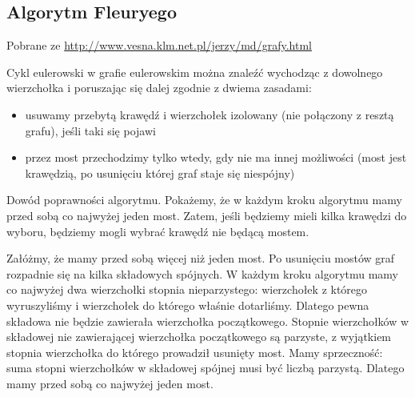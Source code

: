 \subsection{Algorytm Fleuryego}
Pobrane ze \url{http://www.vesna.klm.net.pl/jerzy/md/grafy.html}\\
\begin{definition}
Cykl eulerowski w grafie eulerowskim można znaleźć wychodząc z dowolnego wierzchołka i poruszając się dalej zgodnie z dwiema zasadami:
\begin{itemize}
\item usuwamy przebytą krawędź i wierzchołek izolowany (nie połączony z resztą grafu), jeśli taki się pojawi
\item przez most przechodzimy tylko wtedy, gdy nie ma innej możliwości (most jest krawędzią, po usunięciu której graf staje się niespójny)
\end{itemize}

Dowód poprawności algorytmu. Pokażemy, że w każdym kroku algorytmu mamy przed sobą co najwyżej jeden most. Zatem, jeśli będziemy mieli kilka krawędzi do wyboru, będziemy mogli wybrać krawędź nie będącą mostem.


Załóżmy, że mamy przed sobą więcej niż jeden most. Po usunięciu mostów graf rozpadnie się na kilka składowych spójnych. W każdym kroku algorytmu mamy co najwyżej dwa wierzchołki stopnia nieparzystego: wierzchołek z którego wyruszyliśmy i wierzchołek do którego właśnie dotarliśmy. Dlatego pewna składowa nie będzie zawierała wierzchołka początkowego. Stopnie wierzchołków w składowej nie zawierającej wierzchołka początkowego są parzyste, z wyjątkiem stopnia wierzchołka do którego prowadził usunięty most. Mamy sprzeczność: suma stopni wierzchołków w składowej spójnej musi być liczbą parzystą. Dlatego mamy przed sobą co najwyżej jeden most.
\end{definition}

